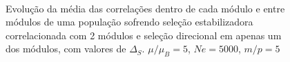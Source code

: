 \begin{center}
\begin{figure}[htbp]
      \vspace{-18pt}
      \vspace{11pt}
      \\
      \caption{ Evolução da média das correlações dentro de cada módulo
      e entre módulos de uma população sofrendo seleção estabilizadora
      correlacionada com 2 módulos e seleção direcional em apenas um dos
      módulos, com valores de $\Delta_S$. $\mu/\mu_B = 5$, $Ne = 5000$, $m/p=5$}
      \label{CoAVG}
   \end{figure}
\end{center}
